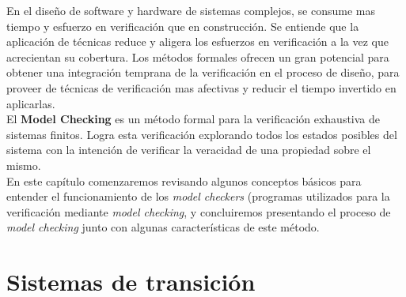 \documentclass[titlepage, 12pt]{book}
\begin{document}
En el dise\~no de software y hardware de sistemas complejos, se consume mas tiempo y esfuerzo en verificaci\'on que en construcci\'on. Se entiende que la aplicaci\'on de t\'ecnicas reduce y aligera los esfuerzos en verificaci\'on a la vez que acrecientan su cobertura. Los m\'etodos formales ofrecen un gran potencial para obtener una integraci\'on temprana de la verificaci\'on en el proceso de dise\~no, para proveer de t\'ecnicas de verificaci\'on mas afectivas y reducir el tiempo invertido en aplicarlas\cite{prinMC}.\\

El \textbf{Model Checking} es un m\'etodo formal para la verificaci\'on exhaustiva de sistemas finitos. Logra esta verificaci\'on explorando todos los estados posibles del sistema con la intenci\'on de verificar la veracidad de una propiedad sobre el mismo.\\

En este cap\'itulo comenzaremos revisando algunos conceptos b\'asicos para entender el funcionamiento de los \textit{model checkers} (programas utilizados para la verificaci\'on mediante \textit{model checking}, y concluiremos presentando el proceso de \textit{model checking} junto con algunas caracter\'isticas de este m\'etodo.









\section{Sistemas de transici\'on}
\end{document}

